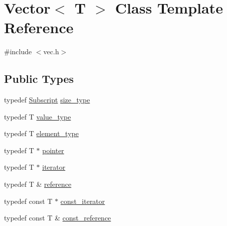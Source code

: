 \hypertarget{class_vector}{\section{Vector$<$ T $>$ Class Template Reference}
\label{class_vector}
}


{\ttfamily \#include $<$vec.\+h$>$}

\subsection*{Public Types}
\begin{DoxyCompactItemize}
\item 
typedef \hyperlink{vec_8h_a2dedc729e88b5f13d52bc9aeeda264dc}{Subscript} \hyperlink{class_vector_af11e5408e13f84b5de506db7681cf46e}{size\+\_\+type}
\item 
typedef T \hyperlink{class_vector_a79be47483938eb902a0a5af772985850}{value\+\_\+type}
\item 
typedef T \hyperlink{class_vector_a89d40fb2fabe6e0576ad9de72e829df1}{element\+\_\+type}
\item 
typedef T $\ast$ \hyperlink{class_vector_a79c196184d53dc1e6c4f7841392e528e}{pointer}
\item 
typedef T $\ast$ \hyperlink{class_vector_a30c203480dfd28a0f1fde5c08a68db94}{iterator}
\item 
typedef T \& \hyperlink{class_vector_aacab8f5d93fda39cbdf810e3440d1c29}{reference}
\item 
typedef const T $\ast$ \hyperlink{class_vector_acbec6290edaeacd3b3b72f39bf910365}{const\+\_\+iterator}
\item 
typedef const T \& \hyperlink{class_vector_a44d455da2c2c75f0ffda9856aa52308d}{const\+\_\+reference}
\end{DoxyCompactItemize}
